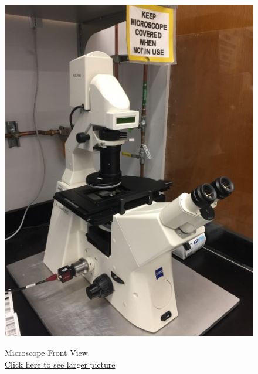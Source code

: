 \documentclass{../lab}
\begin{document}
\begin{figure}[H]
  \href{http://experimentationlab.berkeley.edu/sites/default/files/upimages/1_Microscope_2539.JPG}{\includegraphics[width=\linewidth,keepaspectratio]{images/1_Microscope_2539.JPG}}
  \caption{Microscope Front View\\ \href{http://experimentationlab.berkeley.edu/sites/default/files/upimages/1_Microscope_2539.JPG}{Click here to see larger picture}}\label{fig:Microscope}
\endminipage
\end{figure}
\end{document}
